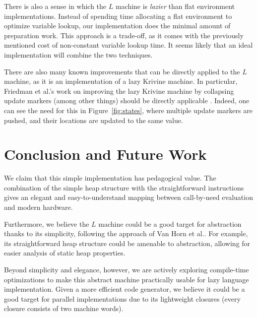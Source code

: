 \documentclass[preprint]{sigplanconf}
\begin{document}
There is also a sense in which the $L$ machine is \emph{lazier} than flat
environment implementations. Instead of spending time allocating a flat
environment to optimize variable lookup, our implementation does the minimal
amount of preparation work. This approach is a trade-off, as it comes with the
previously mentioned cost of non-constant variable lookup time. It seems likely
that an ideal implementation will combine the two techniques. 

There are also many known improvements that can be directly applied to the $L$
machine, as it is an implementation of a lazy Krivine machine. In particular,
Friedman et al.'s work on improving the lazy Krivine machine by collapsing
update markers (among other things) should be directly applicable \cite{lkm}.
Indeed, one can see the need for this in Figure~\ref{fig:states}, where multiple
update markers are pushed, and their locations are updated to the same value.

\section{Conclusion and Future Work}
We claim that this simple implementation has pedagogical value. The combination
of the simple heap structure with the straightforward instructions gives an
elegant and easy-to-understand mapping between call-by-need evaluation and
modern hardware.

Furthermore, we believe the $L$ machine could be a good target for abstraction
thanks to its simplicity, following the approach of Van Horn et
al.\cite{van2010abstracting}. For example, its straightforward heap structure
could be amenable to abstraction, allowing for easier analysis of static heap
properties.

Beyond simplicity and elegance, however, we are actively exploring compile-time
optimizations to make this abstract machine practically usable for lazy language
implementation. Given a more efficient code generator, we believe it could be a
good target for parallel implementations due to its lightweight closures (every
closure consists of two machine words).



\end{document}
